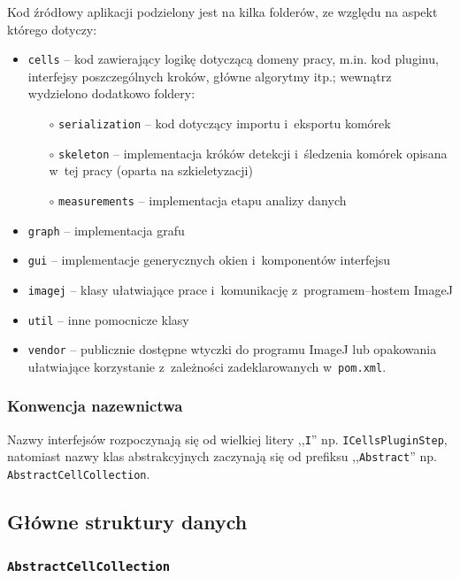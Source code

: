 \documentclass[declaration,shortabstract,mgr]{iithesis}
\begin{document}
Kod źródłowy aplikacji podzielony jest na kilka folderów, ze względu na aspekt którego dotyczy:

\begin{itemize}
  \item \texttt{cells} -- kod zawierający logikę dotyczącą domeny pracy, m.in. kod pluginu, interfejsy poszczególnych kroków, główne algorytmy itp.; wewnątrz wydzielono dodatkowo foldery:
  \begin{itemize}
    \item[$\circ$] \texttt{serialization} -- kod dotyczący importu i~eksportu komórek
    \item[$\circ$] \texttt{skeleton} -- implementacja króków detekcji i~śledzenia komórek opisana w~tej pracy (oparta na szkieletyzacji)
    \item[$\circ$] \texttt{measurements} -- implementacja etapu analizy danych
  \end{itemize}
  \item \texttt{graph} -- implementacja grafu
  \item \texttt{gui} -- implementacje generycznych okien i~komponentów interfejsu
  \item \texttt{imagej} -- klasy ułatwiające prace i~komunikację z~programem--hostem ImageJ
  \item \texttt{util} -- inne pomocnicze klasy
  \item \texttt{vendor} -- publicznie dostępne wtyczki do programu ImageJ lub opakowania ułatwiające korzystanie z~zależności zadeklarowanych w~\texttt{pom.xml}.
\end{itemize}

\subsubsection{Konwencja nazewnictwa}

Nazwy interfejsów rozpoczynają się od wielkiej litery ,,\texttt{I}'' np. \texttt{ICellsPluginStep}, natomiast nazwy klas abstrakcyjnych zaczynają się od prefiksu ,,\texttt{Abstract}'' np. \texttt{AbstractCellCollection}.

\subsection{Główne struktury danych}

\subsubsection{\texttt{AbstractCellCollection}}
\end{document}
